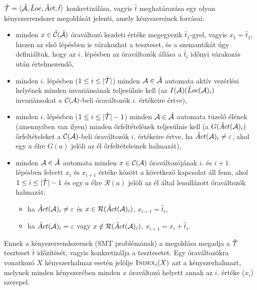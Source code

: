 $\hat{\mathcal{T}} = \langle \hat{\mathcal{A}}, \hat{L}oc, \hat{A}ct, \hat{t} \rangle$ konkretizálása, vagyis $\hat{t}$ meghatározása egy olyan kényszerrendszer megoldását jelenti, amely kényszereinek forrásai:
\begin{itemize}
    \item minden $x \in \hat{\mathcal{C}}(\hat{\mathcal{A}})$ óraváltozó kezdeti értéke megegyezik $\hat{t}_1$-gyel, vagyis $x_1 = \hat{t}_1$, hiszen az első lépésben is várakozhat a teszteset, és a szemantikát úgy definiáltuk, hogy az $i.$ lépésben az óraváltozók állása a $\hat{t}_i$ időnyi várakozás után értelmezendő,
    \item minden $i.$ lépésben ($1 \leq i \leq |\hat{\mathcal{T}}|$) minden $\mathcal{A} \in \hat{\mathcal{A}}$ automata aktív vezérlési helyének minden invariánsának teljesülnie kell (az $I(\mathcal{A})(\hat{L}oc(\mathcal{A})_i)$ invariánsokat a $\mathcal{C}(\mathcal{A})$-beli óraváltozók $i.$ értékeire értve),
    \item minden $i.$ lépésben ($1 \leq i \leq |\hat{\mathcal{T}}| - 1$) minden $\mathcal{A} \in \hat{\mathcal{A}}$ automata tüzelő élének (amennyiben van ilyen) minden őrfeltételének teljesülnie kell (a $G(\hat{A}ct(\mathcal{A})_i)$ őrfeltételeket a $\mathcal{C}(\mathcal{A})$-beli óraváltozók $i.$ értékeire értve, ha $\hat{A}ct(\mathcal{A})_i \neq \varepsilon$, ahol egy $a$ élre $G(a)$ jelöli az él őrfeltételeinek halmazát),
    \item minden $\mathcal{A} \in \hat{\mathcal{A}}$ automata minden $x \in \mathcal{C}(\mathcal{A})$ óraváltozójának $i.$ és $i + 1$. lépésben felvett $x_i$ és $x_{i+1}$ értéke között a következő kapcsolat áll fenn, ahol $1 \leq i \leq |\hat{\mathcal{T}}| - 1$ és egy $a$ élre $\mathcal{R}(a)$ jelöli az él által lenullázott óraváltozók halmazát:
    \begin{itemize}
        \item ha $\hat{A}ct(\mathcal{A})_i \neq \varepsilon$ és $x \in \mathcal{R}(\hat{A}ct(\mathcal{A})_i)$, $x_{i+1} = \hat{t}_i$,
        \item ha $\hat{A}ct(\mathcal{A})_i = \varepsilon$ vagy $x \notin \mathcal{R}(\hat{A}ct(\mathcal{A})_i)$, $x_{i+1} = x_i + \hat{t}_i$.
    \end{itemize}
\end{itemize}

Ennek a kényszerrendszernek (SMT problémának) a megoldása megadja a $\hat{\mathcal{T}}$ teszteset $\hat{t}$ időzítését, vagyis konkretizálja a tesztesetet. Egy óraváltozókra vonatkozó $X$ kényszerhalmaz esetén jelölje $\textsc{Index}_i(X)$ azt a kényszerhalmazt, melynek minden kényszerében minden $x$ óraváltozó helyett annak az $i.$ értéke ($x_i$) szerepel.

